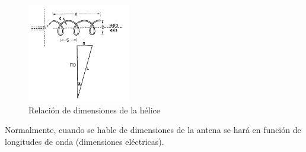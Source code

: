\documentclass[12pt]{article}
\begin{document}
\begin{figure}[h]
	\centering
	\includegraphics[width=0.40\textwidth]{parametros.png}
	\caption{Relación de dimensiones de la hélice}
	\label{fig:param}
\end{figure}

Normalmente, cuando se hable de dimensiones de la antena se hará en función de longitudes de onda (dimensiones eléctricas).
\end{document}
